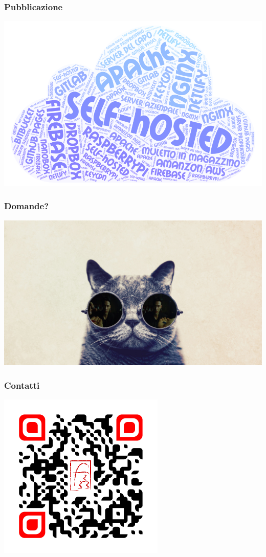 \begin{frame}
	\frametitle{Pubblicazione}
	\begin{center}
		\includegraphics[scale=0.32]{img/WordArt.png}
	\end{center}
\end{frame}

\begin{frame}
	\frametitle{Domande?}
	\begin{center}
		\includegraphics[scale=0.15]{img/cat-with-glasses}
	\end{center}
\end{frame}

\begin{frame}
	\frametitle{Contatti}
	\begin{center}
		\includegraphics[scale=0.67]{img/fundor333}
	\end{center}
\end{frame}


